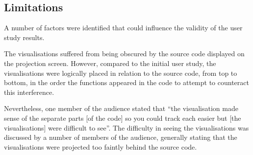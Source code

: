 





\subsection{Limitations}

A number of factors were identified that could influence the validity of the user study results.

The visualisations suffered from being obscured by the source code displayed on the projection screen. However, compared to the initial user study, the visualisations were logically placed in relation to the source code, from top to bottom, in the order the functions appeared in the code to attempt to counteract this interference.

Nevertheless, one member of the audience stated that ``the visualisation made sense of the separate parts [of the code] so you could track each easier but [the visualisations] were difficult to see''. The difficulty in seeing the visualisations was discussed by a number of members of the audience, generally stating that the visualisations were projected too faintly behind the source code.

